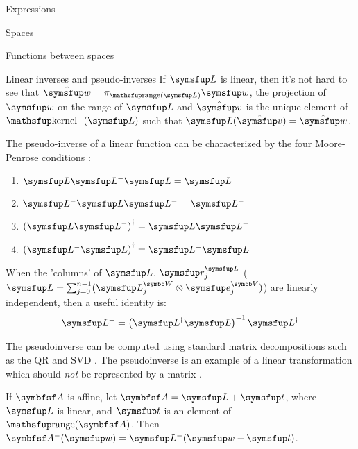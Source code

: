 \documentclass[12pt]{PalisadesLakesArticle}
\begin{document}
\begin{plSection}{Expressions}
\begin{plSection}{Spaces}
\begin{plSection}{Functions between spaces}
\begin{plSection}{Linear inverses and pseudo-inverses}
If $\Vector{L}$ is linear, then it's not hard to see that
$\hat{\Vector{w}} = \pi_{\range(\Vector{L})} \Vector{w}$, the projection of $\Vector{w}$
on the range of $\Vector{L}$
and
$\hat{\Vector{v}}$ is the unique element of $\kernel^{\perp}(\Vector{L})$
such that $\Vector{L}(\hat{\Vector{v}}) = \hat{\Vector{w}}$.

The pseudo-inverse of a linear function can be characterized
by the four Moore-Penrose 
conditions :
\begin{enumerate}
\item $\Vector{L} \Vector{L}^{-} \Vector{L} = \Vector{L}$
\item $\Vector{L}^{-} \Vector{L} \Vector{L}^{-} = \Vector{L}^{-}$
\item $\left( \Vector{L} \Vector{L}^{-} \right)^{\dagger} = \Vector{L} \Vector{L}^{-}$
\item $\left( \Vector{L}^{-} \Vector{L} \right)^{\dagger} = \Vector{L}^{-} \Vector{L}$
\end{enumerate}

When the 'columns' of $\Vector{L}$, $\Vector{r}_j^{\Vector{L}}$
($\Vector{L} = \sum_{j=0}^{n-1} ( \Vector{L}_j^{\Space{W}} \otimes \Vector{e}_j^{\Space{V}} )$)
are linearly independent,
then a useful identity is:
\begin{equation}
\label{eq:full-rank-pseudo-inverse}
\Vector{L}^{-} = \left( \Vector{L}^{\dagger} \Vector{L} \right)^{-1} \Vector{L}^{\dagger}
\end{equation}

The pseudoinverse can be computed
using standard matrix decompositions such as
the QR and SVD .
The pseudoinverse is an example of a linear transformation
which should {\em not} be represented by a matrix
.

If $\Point{A}$ is affine,
let $\Point{A} = \Vector{L} + \Vector{t}$,
where $\Vector{L}$ is linear,
and $\Vector{t}$ is an element of $\range(\Point{A})$.
Then $\Point{A}^{-}(\Vector{w}) = \Vector{L}^{-}( \Vector{w} - \Vector{t} )$.
\end{plSection}%
\end{plSection}%
\end{plSection}%
\end{plSection}%
\end{document}
